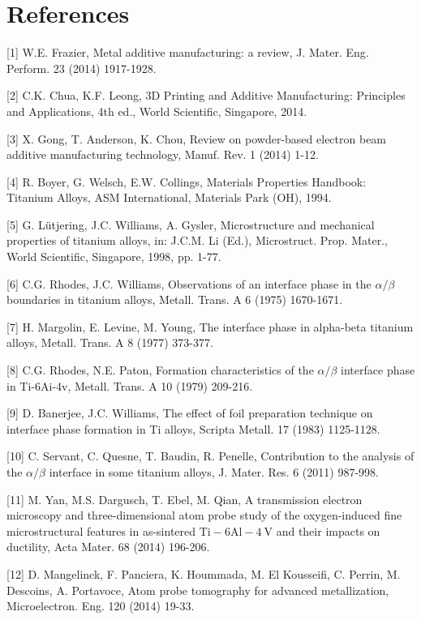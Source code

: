 \documentclass[10pt]{article}
\begin{document}
\section*{References}
[1] W.E. Frazier, Metal additive manufacturing: a review, J. Mater. Eng. Perform. 23 (2014) 1917-1928.

[2] C.K. Chua, K.F. Leong, 3D Printing and Additive Manufacturing: Principles and Applications, 4th ed., World Scientific, Singapore, 2014.

[3] X. Gong, T. Anderson, K. Chou, Review on powder-based electron beam additive manufacturing technology, Manuf. Rev. 1 (2014) 1-12.

[4] R. Boyer, G. Welsch, E.W. Collings, Materials Properties Handbook: Titanium Alloys, ASM International, Materials Park (OH), 1994.

[5] G. Lütjering, J.C. Williams, A. Gysler, Microstructure and mechanical properties of titanium alloys, in: J.C.M. Li (Ed.), Microstruct. Prop. Mater., World Scientific, Singapore, 1998, pp. 1-77.

[6] C.G. Rhodes, J.C. Williams, Observations of an interface phase in the $\alpha / \beta$ boundaries in titanium alloys, Metall. Trans. A 6 (1975) 1670-1671.

[7] H. Margolin, E. Levine, M. Young, The interface phase in alpha-beta titanium alloys, Metall. Trans. A 8 (1977) 373-377.

[8] C.G. Rhodes, N.E. Paton, Formation characteristics of the $\alpha / \beta$ interface phase in Ti-6Ai-4v, Metall. Trans. A 10 (1979) 209-216.

[9] D. Banerjee, J.C. Williams, The effect of foil preparation technique on interface phase formation in Ti alloys, Scripta Metall. 17 (1983) 1125-1128.

[10] C. Servant, C. Quesne, T. Baudin, R. Penelle, Contribution to the analysis of the $\alpha / \beta$ interface in some titanium alloys, J. Mater. Res. 6 (2011) 987-998.

[11] M. Yan, M.S. Dargusch, T. Ebel, M. Qian, A transmission electron microscopy and three-dimensional atom probe study of the oxygen-induced fine microstructural features in as-sintered $\mathrm{Ti}-6 \mathrm{Al}-4 \mathrm{~V}$ and their impacts on ductility, Acta Mater. 68 (2014) 196-206.

[12] D. Mangelinck, F. Panciera, K. Hoummada, M. El Kousseifi, C. Perrin, M. Descoins, A. Portavoce, Atom probe tomography for advanced metallization, Microelectron. Eng. 120 (2014) 19-33.
\end{document}
